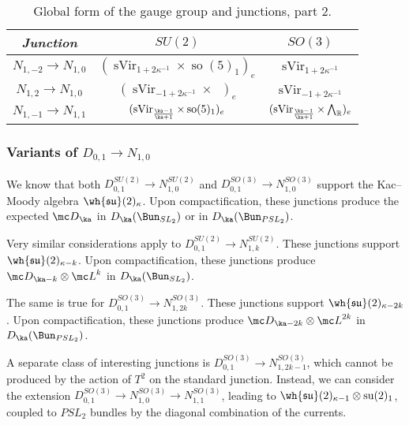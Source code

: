\documentclass[11pt,reqno]{amsart}
\theoremstyle{plain}
\numberwithin{equation}{section}
\newcommand{\R}{\mathbb{R}}
\DeclareMathOperator{\sVir}{sVir}
\DeclareMathOperator{\tsu}{su}
\DeclareMathOperator{\tso}{so}
\DeclareMathOperator{\Ff}{\bigwedge_{\R}}
\theoremstyle{definition}
\begin{document}
\begin{table}[h]
\begin{center}
\begin{tabular}{|c||c||c|}
\hline
{\em Junction} & {\em $SU(2)$}& {\em $SO(3)$}  \\
\hline \hline
$N_{1,-2}\to N_{1,0}$& $( \sVir_{1+2 \kappa^{-1}}  \times \tso(5)_1)_e$ & $\sVir_{1+2 \kappa^{-1}}$  \\ 
\hline
$N_{1,2}\to N_{1,0}$& $( \sVir_{-1+2 \kappa^{-1}}  \times \Ff)_e$& $\sVir_{-1+2 \kappa^{-1}}$  \\ 
\hline
$N_{1,-1} \to N_{1,1}$ & $( \sVir_{\frac{\ka-1}{\ka+1}} \times \tso(5)_1)_e$& $( \sVir_{\frac{\ka-1}{\ka+1}}  \times \Ff)_e$  \\
\hline
\end{tabular} 
\end{center}
\vspace*{5mm}
\caption{Global form of the gauge group and junctions, part 2.}\label{tab:five}
\end{table}

\subsubsection{Variants of $D_{0,1} \to N_{1,0}$}

We know that both $D^{SU(2)}_{0,1} \to N^{SU(2)}_{1,0}$ and $D^{SO(3)}_{0,1} \to N^{SO(3)}_{1,0}$
support the Kac--Moody algebra $\wh{\mathfrak{su}}(2)_{\kappa}$. Upon compactification, 
these junctions produce the expected ${\mc D}_{\ka}$ in $D_{\ka}(\Bun_{SL_2})$ or in $D_{\ka}(\Bun_{PSL_2})$.

Very similar considerations apply to $D^{SU(2)}_{0,1} \to N^{SU(2)}_{1,k}$. These junctions support 
$\wh{\mathfrak{su}}(2)_{\kappa-k}$. Upon compactification, 
these junctions produce ${\mc D}_{\ka-k} \otimes {\mc L}^k$ in $D_{\ka}(\Bun_{SL_2})$.

The same is true for $D^{SO(3)}_{0,1} \to N^{SO(3)}_{1,2 k}$. These junctions support 
$\wh{\mathfrak{su}}(2)_{\kappa-2k}$. Upon compactification, 
these junctions produce ${\mc D}_{\ka-2k} \otimes {\mc L}^{2k}$ in $D_{\ka}(\Bun_{PSL_2})$.

A separate class of interesting junctions is $D^{SO(3)}_{0,1} \to N^{SO(3)}_{1,2 k-1}$,
which cannot be produced by the action of $T^2$ on the standard junction. Instead, we can 
consider the extension $D^{SO(3)}_{0,1} \to N^{SO(3)}_{1,0}\to N^{SO(3)}_{1,1}$, 
leading to $\wh{\mathfrak{su}}(2)_{\kappa-1} \otimes \tsu(2)_1$, coupled to $PSL_2$ bundles 
by the diagonal combination of the currents. 
\end{document}
